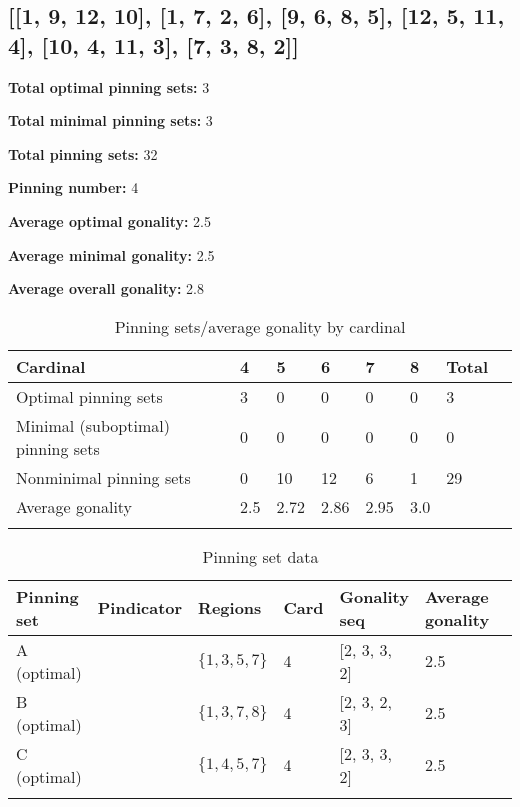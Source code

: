 \documentclass{article}%
\begin{document}
\newpage

\subsection{[[1, 9, 12, 10], [1, 7, 2, 6], [9, 6, 8, 5], [12, 5, 11, 4], [10, 4, 11, 3], [7, 3, 8, 2]]}

\begin{multicols}{2}
{\normalsize \noindent\textbf{Total optimal pinning sets:} 3

\noindent\textbf{Total minimal pinning sets:} 3

\noindent\textbf{Total pinning sets:} 32

\noindent\textbf{Pinning number:} 4

}
\columnbreak

{\normalsize \noindent\textbf{Average optimal gonality:} 2.5

\noindent\textbf{Average minimal gonality:} 2.5

\noindent\textbf{Average overall gonality:} 2.8

}
\end{multicols}

\begin{table}[ht]
	\caption{Pinning sets/average gonality by cardinal}
	\centering
	\renewcommand{\arraystretch}{1.5}
	\begin{tabularx}{\textwidth}{lXXXXXXX}
		\toprule
			Cardinal & 4 & 5 & 6 & 7 & 8 & Total\\
			\hline
			Optimal pinning sets & 3 & 0 & 0 & 0 & 0 & 3 \\
			Minimal (suboptimal) pinning sets & 0 & 0 & 0 & 0 & 0 & 0 \\
			Nonminimal pinning sets & 0 & 10 & 12 & 6 & 1 & 29 \\
			Average gonality & 2.5 & 2.72 & 2.86 & 2.95 & 3.0 &  \\
		\bottomrule \\ 
	\end{tabularx}
\end{table}

\begin{table}[ht]
	\caption{Pinning set data}
	\centering
	\renewcommand{\arraystretch}{1.5}
	\begin{tabularx}{\textwidth}{lXXXXXX}
		\toprule
			Pinning set & Pindicator & Regions & Card & Gonality seq & Average gonality\\
			\hline
			A (optimal) & {\Huge\textcolor{red0}{\textbullet}} & $\{1,3,5,7\}$ & 4 & [2, 3, 3, 2] & 2.5 \\
			B (optimal) & {\Huge\textcolor{red1}{\textbullet}} & $\{1,3,7,8\}$ & 4 & [2, 3, 2, 3] & 2.5 \\
			C (optimal) & {\Huge\textcolor{red2}{\textbullet}} & $\{1,4,5,7\}$ & 4 & [2, 3, 3, 2] & 2.5 \\
		\bottomrule \\ 
	\end{tabularx}
\end{table}
\end{document}

